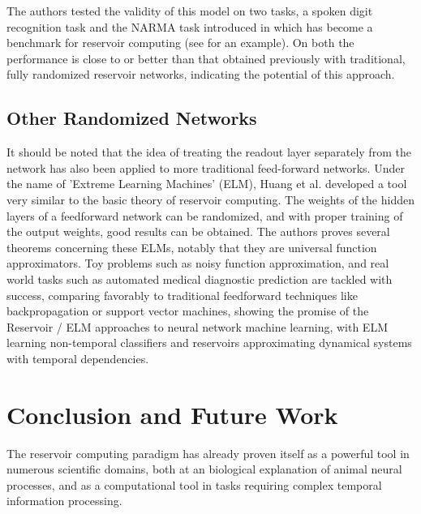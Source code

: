 \documentclass[12pt,oneside]{CUNY_CS_PhD}
\begin{document}
The authors tested the validity of this model on two tasks, a spoken digit recognition task and the NARMA task introduced in \cite{atiya2000new} which has become a benchmark for reservoir computing (see \cite{lukosevicius_survey:_2009} for an example). On both the performance is close to or better than that obtained previously with traditional, fully randomized reservoir networks, indicating the potential of this approach.

\section{Other Randomized Networks}
It should be noted that the idea of treating the readout layer separately from the network has also been applied to more traditional feed-forward networks. Under the name of 'Extreme Learning Machines' (ELM), Huang et al. \cite{huang_extreme_2006,huang_extreme_2011} developed a tool very similar to the basic theory of reservoir computing. The weights of the hidden layers of a feedforward network can be randomized, and with proper training of the output weights, good results can be obtained. The authors proves several theorems concerning these ELMs, notably that they are universal function approximators. Toy problems such as noisy function approximation, and real world tasks such as automated medical diagnostic prediction are tackled with success, comparing favorably to traditional feedforward techniques like backpropagation or support vector machines, showing the promise of the Reservoir / ELM approaches to neural network machine learning, with ELM learning non-temporal classifiers and reservoirs approximating dynamical systems with temporal dependencies.

\chapter{Conclusion and Future Work} 
The reservoir computing paradigm has already proven itself as a powerful tool in numerous scientific domains, both at an biological explanation of animal neural processes, and as a computational tool in tasks requiring complex temporal information processing.
\end{document}
